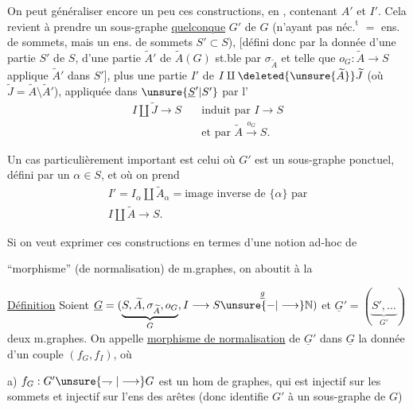 On peut généraliser encore un peu ces constructions, en    , contenant $A'$ et $I'$. Cela revient à prendre un sous-graphe \uline{quelconque} $G'$ de $G$ (n'ayant pas $\text{néc.}^{\text{t}}$  $=$ ens. de sommets, mais un ens. de sommets $S'\subset S$), [défini donc par la donnée d'une partie $S'$ de $S$, d'une partie $\widetilde A'$ de $\widetilde A(G)$ st.ble par $\sigma_{\widetilde A}$ et telle que $o_G:\widetilde A\longrightarrow S$ applique $\widetilde A'$ dans $S'$], plus une partie $I'$ de $I\amalg\deleted{\unsure{\widetilde A}}\widetilde J$ (où $\widetilde J=\widetilde A\setminus\widetilde A'$), appliquée dans $\unsure{\underline{S}'|S'}$ par l'
\[
\begin{aligned}
I\amalg\widetilde J\longrightarrow S\quad &\text{induit par }I\longrightarrow S\\
&\text{et par }\widetilde A\xrightarrow{o_G}S.
\end{aligned}
\]

Un cas particulièrement important est celui où $G'$ est un sous-graphe ponctuel, défini par un $\alpha\in S$,  et où on prend
\[
\begin{gathered}
I'=I_\alpha\amalg\widetilde A_\alpha=\text{image inverse de }\{\alpha\}\text{ par}\\
I\amalg\widetilde A\longrightarrow S.
\end{gathered}
\]

Si on veut exprimer ces constructions en termes d'une notion ad-hoc de

``morphisme'' (de normalisation) de m.graphes, on aboutit à la

\uline{Définition} Soient $\underline G=(\underbrace{S,\widetilde A,\sigma_{\widetilde A},o_G}_{G},I\longrightarrow S\overset{\underline g}{\unsure{-|\longrightarrow}}\mathbb N)$ et $\underline G'=(\underbrace{S',\ldots}_{G'})$ deux m.graphes. On appelle \uline{morphisme de normalisation} de $\underline G'$ dans $\underline G$ la donnée d'un couple  $(f_G,f_I)$, où

a) $f_G:G'\unsure{\rightharpoondown|\longrightarrow}G$ est un hom de graphes, qui est injectif sur les sommets et injectif sur l'ens des arêtes (donc identifie $G'$ à un sous-graphe de $G$)

